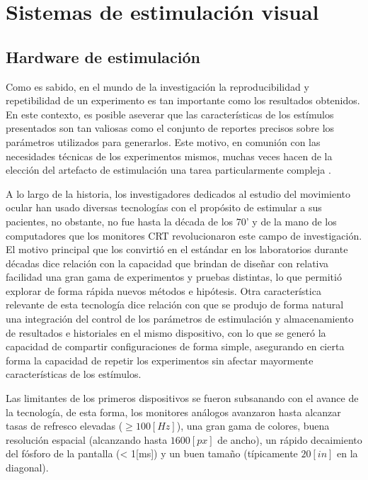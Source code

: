 \documentclass[../main.tex]{subfiles}
\begin{document}
	\section{Sistemas de estimulación visual}
	\label{sec:02_sistemas_de_estimulacion_visual}
		\subsection{Hardware de estimulación}
		\label{sub:02_hardware_de_estimulacion}

		Como es sabido, en el mundo de la investigación la reproducibilidad y repetibilidad de un experimento es tan importante como los resultados obtenidos. En este contexto, es posible aseverar que las características de los estímulos presentados son tan valiosas como el conjunto de reportes precisos sobre los parámetros utilizados para generarlos. Este motivo, en comunión con las necesidades técnicas de los experimentos mismos, muchas veces hacen de la elección del artefacto de estimulación una tarea particularmente compleja \cite{article:monitor_beuer}.

		A lo largo de la historia, los investigadores dedicados al estudio del movimiento ocular han usado diversas tecnologías con el propósito de estimular a sus pacientes, no obstante, no fue hasta la década de los 70' y de la mano de los computadores que los monitores CRT revolucionaron este campo de investigación. El motivo principal que los convirtió en el estándar en los laboratorios durante décadas dice relación con la capacidad que brindan de diseñar con relativa facilidad una gran gama de experimentos y pruebas distintas, lo que permitió explorar de forma rápida nuevos métodos e hipótesis. Otra característica relevante de esta tecnología dice relación con que se produjo de forma natural una integración del control de los parámetros de estimulación y almacenamiento de resultados e historiales en el mismo dispositivo, con lo que se generó la capacidad de compartir configuraciones de forma simple, asegurando en cierta forma la capacidad de repetir los experimentos sin afectar mayormente características de los estímulos. 

		Las limitantes de los primeros dispositivos se fueron subsanando con el avance de la tecnología, de esta forma, los monitores análogos avanzaron hasta alcanzar tasas de refresco elevadas ($\geq 100[Hz]$), una gran gama de colores, buena resolución espacial (alcanzando hasta $1600[px]$ de ancho), un rápido decaimiento del fósforo de la pantalla (< 1[ms]) y un buen tamaño (típicamente $20[in]$ en la diagonal).
\end{document}
